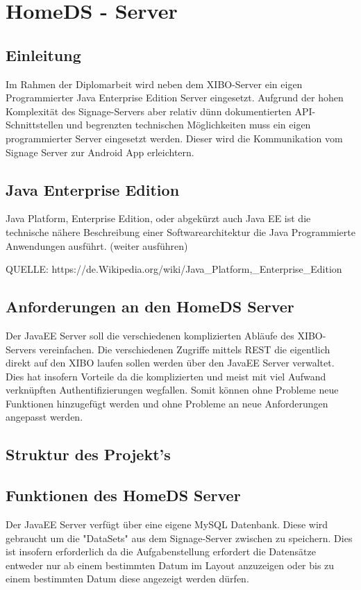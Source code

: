 \chapter{HomeDS - Server}
\section{Einleitung}\label{sec:einleitung}
Im Rahmen der Diplomarbeit wird neben dem XIBO-Server ein eigen Programmierter Java Enterprise Edition Server eingesetzt. Aufgrund der hohen Komplexität des Signage-Servers aber relativ dünn dokumentierten API-Schnittstellen und begrenzten technischen Möglichkeiten muss ein eigen programmierter Server eingesetzt werden. Dieser wird die Kommunikation vom Signage Server zur Android App erleichtern.  
 
\section{Java Enterprise Edition}\label{sec:javaee}
Java Platform, Enterprise Edition, oder abgekürzt auch Java EE ist die technische nähere Beschreibung einer Softwarearchitektur die Java Programmierte Anwendungen ausführt.
(weiter ausführen)

QUELLE: https://de.Wikipedia.org/wiki/Java_Platform,_Enterprise_Edition
 
\section{Anforderungen an den HomeDS Server}\label{sec:homeds}
Der JavaEE Server soll die verschiedenen komplizierten Abläufe des XIBO-Servers vereinfachen. Die verschiedenen Zugriffe mittels REST die eigentlich direkt auf den XIBO laufen sollen werden über den JavaEE Server verwaltet. Dies hat insofern Vorteile da die komplizierten und meist mit viel Aufwand verknüpften Authentifizierungen wegfallen. Somit können ohne Probleme neue Funktionen hinzugefügt werden und ohne Probleme an neue Anforderungen angepasst werden.

\section{Struktur des Projekt's}\label{sec:javaee}
 
\section{Funktionen des HomeDS Server}\label{sec:homedsfunction}
Der JavaEE Server verfügt über eine eigene MySQL Datenbank. Diese wird gebraucht um die "DataSets" aus dem Signage-Server zwischen zu speichern. Dies ist insofern erforderlich da die Aufgabenstellung erfordert die Datensätze entweder nur ab einem bestimmten Datum im Layout anzuzeigen oder bis zu einem bestimmten Datum diese angezeigt werden dürfen. 
 
